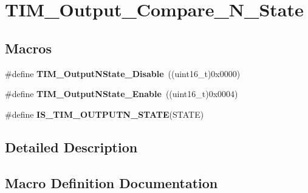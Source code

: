 \hypertarget{group___t_i_m___output___compare___n___state}{}\section{T\+I\+M\+\_\+\+Output\+\_\+\+Compare\+\_\+\+N\+\_\+\+State}
\label{group___t_i_m___output___compare___n___state}
\subsection*{Macros}
\begin{DoxyCompactItemize}
\item 
\hypertarget{group___t_i_m___output___compare___n___state_gade8506a50fd6ba58273e9da81f6b0b54}{}\#define {\bfseries T\+I\+M\+\_\+\+Output\+N\+State\+\_\+\+Disable}~((uint16\+\_\+t)0x0000)\label{group___t_i_m___output___compare___n___state_gade8506a50fd6ba58273e9da81f6b0b54}

\item 
\hypertarget{group___t_i_m___output___compare___n___state_gac4c08f9d66ce138c6978668020526c6f}{}\#define {\bfseries T\+I\+M\+\_\+\+Output\+N\+State\+\_\+\+Enable}~((uint16\+\_\+t)0x0004)\label{group___t_i_m___output___compare___n___state_gac4c08f9d66ce138c6978668020526c6f}

\item 
\#define {\bfseries I\+S\+\_\+\+T\+I\+M\+\_\+\+O\+U\+T\+P\+U\+T\+N\+\_\+\+S\+T\+A\+T\+E}(S\+T\+A\+T\+E)
\end{DoxyCompactItemize}


\subsection{Detailed Description}


\subsection{Macro Definition Documentation}
\hypertarget{group___t_i_m___output___compare___n___state_ga81e27a982d9707f699451f30314c4274}{}
